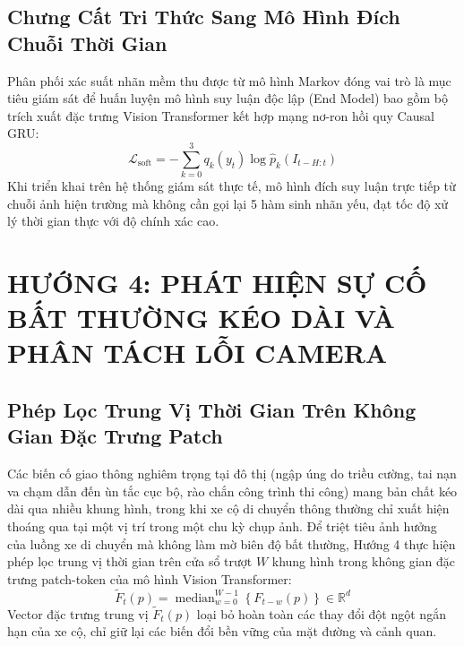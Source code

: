 \documentclass[11pt,a4paper]{article}
\begin{document}
\subsection{Chưng Cất Tri Thức Sang Mô Hình Đích Chuỗi Thời Gian}
Phân phối xác suất nhãn mềm thu được từ mô hình Markov đóng vai trò là mục tiêu giám sát để huấn luyện mô hình suy luận độc lập (End Model) bao gồm bộ trích xuất đặc trưng Vision Transformer kết hợp mạng nơ-ron hồi quy Causal GRU:
\begin{equation}
    \mathcal{L}_{\text{soft}} = - \sum_{k=0}^3 q_k(y_t) \log \hat{p}_k(I_{t-H:t})
\end{equation}
Khi triển khai trên hệ thống giám sát thực tế, mô hình đích suy luận trực tiếp từ chuỗi ảnh hiện trường mà không cần gọi lại 5 hàm sinh nhãn yếu, đạt tốc độ xử lý thời gian thực với độ chính xác cao.

\section{HƯỚNG 4: PHÁT HIỆN SỰ CỐ BẤT THƯỜNG KÉO DÀI VÀ PHÂN TÁCH LỖI CAMERA}

\subsection{Phép Lọc Trung Vị Thời Gian Trên Không Gian Đặc Trưng Patch}
Các biến cố giao thông nghiêm trọng tại đô thị (ngập úng do triều cường, tai nạn va chạm dẫn đến ùn tắc cục bộ, rào chắn công trình thi công) mang bản chất kéo dài qua nhiều khung hình, trong khi xe cộ di chuyển thông thường chỉ xuất hiện thoáng qua tại một vị trí trong một chu kỳ chụp ảnh.
Để triệt tiêu ảnh hưởng của luồng xe di chuyển mà không làm mờ biên độ bất thường, Hướng 4 thực hiện phép lọc trung vị thời gian trên cửa sổ trượt $W$ khung hình trong không gian đặc trưng patch-token của mô hình Vision Transformer:
\begin{equation}
    \tilde{F}_t(p) = \operatorname{median}_{w=0}^{W-1} \left\{ F_{t-w}(p) \right\} \in \mathbb{R}^{d}
\end{equation}
Vector đặc trưng trung vị $\tilde{F}_t(p)$ loại bỏ hoàn toàn các thay đổi đột ngột ngắn hạn của xe cộ, chỉ giữ lại các biến đổi bền vững của mặt đường và cảnh quan.
\end{document}
